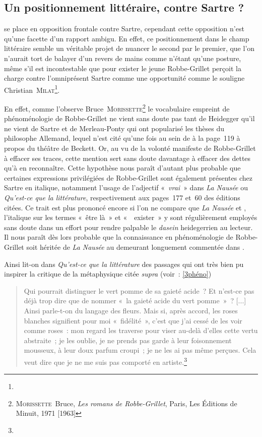 \subsection{Un positionnement littéraire, contre Sartre ?}
\label{vsSartre}

\robbe{} se place en opposition frontale contre Sartre, cependant cette opposition n'est qu'une facette d'un rapport ambigu. En effet, ce positionnement dans le champ littéraire semble un véritable projet de nuancer le second par le premier, que l'on n'aurait tort de balayer d'un revers de mains comme n'étant qu'une posture, même s'il est incontestable que pour exister le jeune Robbe-Grillet perçoit la charge contre l'omniprésent Sartre comme une opportunité comme le souligne Christian~\textsc{Milat}\footnote{}.


En effet, comme l'observe Bruce~\textsc{Morissette}\footnote{\textsc{Morissette}~Bruce, \textit{Les romans de Robbe-Grillet}, Paris, Les Éditions de Minuit, 1971 [1963]} le vocabulaire empreint de phénoménologie de Robbe-Grillet ne vient sans doute pas tant de Heidegger qu'il ne vient de Sartre et de Merleau-Ponty qui ont popularisé les thèses du philosophe Allemand, lequel n'est cité qu'une fois au sein de \punr{} à la page~119 à propos du théâtre de Beckett. Or, au vu de la volonté manifeste de Robbe-Grillet à effacer ses traces, cette mention sert sans doute davantage à effacer des dettes qu'à en reconnaître. Cette hypothèse nous paraît d'autant plus probable que certaines expressions privilégiées de Robbe-Grillet sont également présentes chez Sartre en italique, notamment l'usage de l'adjectif «~\textit{vrai}~» dans \textit{La Nausée} ou \textit{Qu'est-ce que la littérature}, respectivement aux pages~177 et~60 des éditions citées. Ce trait est plus prononcé encore si l'on ne compare que \textit{La Nausée} et \punr, l'italique sur les termes «~être là~» et «~~exister~» y sont régulièrement employés sans doute dans un effort pour rendre palpable le \textit{dasein} heidegerrien au lecteur. Il nous paraît dès lors probable que la connaissance en phénoménologie de Robbe-Grillet soit héritée de \textit{La Nausée} au demeurant longuement commentée dans \punr.

Ainsi lit-on dans \textit{Qu'est-ce que la littérature} des passages qui ont très bien pu inspirer la critique de la métaphysique citée \textit{supra} (voir~: \ref{3phéno})
\begin{quote}
    Qui pourrait distinguer le vert pomme de sa gaieté acide~? Et n'est-ce pas déjà trop dire que de nommer «~la gaieté acide du vert pomme~»~? [...] Ainsi parle-t-on du langage des fleurs. Mais si, après accord, les roses blanches signifient pour moi «~fidélité~», c'est que j'ai cessé de les voir comme roses~: mon regard les traverse pour viser au-delà d'elles cette vertu abstraite~; je les oublie, je ne prends pas garde à leur foisonnement mousseux, à leur doux parfum croupi~; je ne les ai pas même perçues. Cela veut dire que je ne me suis pas comporté en artiste.\footnote{}
\end{quote}


